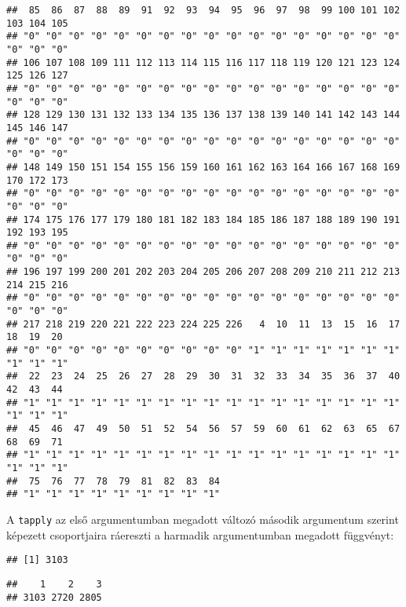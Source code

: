 \documentclass[]{book}
\newenvironment{Shaded}{\begin{snugshade}}{\end{snugshade}}
\newcommand{\DecValTok}[1]{\textcolor[rgb]{0.00,0.00,0.81}{#1}}
\newcommand{\KeywordTok}[1]{\textcolor[rgb]{0.13,0.29,0.53}{\textbf{#1}}}
\newcommand{\NormalTok}[1]{#1}
\newcommand{\OperatorTok}[1]{\textcolor[rgb]{0.81,0.36,0.00}{\textbf{#1}}}
\newcommand{\StringTok}[1]{\textcolor[rgb]{0.31,0.60,0.02}{#1}}
\begin{document}
\begin{verbatim}
##  85  86  87  88  89  91  92  93  94  95  96  97  98  99 100 101 102 103 104 105 
## "0" "0" "0" "0" "0" "0" "0" "0" "0" "0" "0" "0" "0" "0" "0" "0" "0" "0" "0" "0" 
## 106 107 108 109 111 112 113 114 115 116 117 118 119 120 121 123 124 125 126 127 
## "0" "0" "0" "0" "0" "0" "0" "0" "0" "0" "0" "0" "0" "0" "0" "0" "0" "0" "0" "0" 
## 128 129 130 131 132 133 134 135 136 137 138 139 140 141 142 143 144 145 146 147 
## "0" "0" "0" "0" "0" "0" "0" "0" "0" "0" "0" "0" "0" "0" "0" "0" "0" "0" "0" "0" 
## 148 149 150 151 154 155 156 159 160 161 162 163 164 166 167 168 169 170 172 173 
## "0" "0" "0" "0" "0" "0" "0" "0" "0" "0" "0" "0" "0" "0" "0" "0" "0" "0" "0" "0" 
## 174 175 176 177 179 180 181 182 183 184 185 186 187 188 189 190 191 192 193 195 
## "0" "0" "0" "0" "0" "0" "0" "0" "0" "0" "0" "0" "0" "0" "0" "0" "0" "0" "0" "0" 
## 196 197 199 200 201 202 203 204 205 206 207 208 209 210 211 212 213 214 215 216 
## "0" "0" "0" "0" "0" "0" "0" "0" "0" "0" "0" "0" "0" "0" "0" "0" "0" "0" "0" "0" 
## 217 218 219 220 221 222 223 224 225 226   4  10  11  13  15  16  17  18  19  20 
## "0" "0" "0" "0" "0" "0" "0" "0" "0" "0" "1" "1" "1" "1" "1" "1" "1" "1" "1" "1" 
##  22  23  24  25  26  27  28  29  30  31  32  33  34  35  36  37  40  42  43  44 
## "1" "1" "1" "1" "1" "1" "1" "1" "1" "1" "1" "1" "1" "1" "1" "1" "1" "1" "1" "1" 
##  45  46  47  49  50  51  52  54  56  57  59  60  61  62  63  65  67  68  69  71 
## "1" "1" "1" "1" "1" "1" "1" "1" "1" "1" "1" "1" "1" "1" "1" "1" "1" "1" "1" "1" 
##  75  76  77  78  79  81  82  83  84 
## "1" "1" "1" "1" "1" "1" "1" "1" "1"
\end{verbatim}

A \texttt{tapply} az első argumentumban megadott változó második argumentum szerint képezett csoportjaira ráereszti a harmadik argumentumban megadott függvényt:

\begin{Shaded}
\end{Shaded}

\begin{verbatim}
## [1] 3103
\end{verbatim}

\begin{Shaded}
\end{Shaded}

\begin{verbatim}
##    1    2    3 
## 3103 2720 2805
\end{verbatim}
\end{document}
